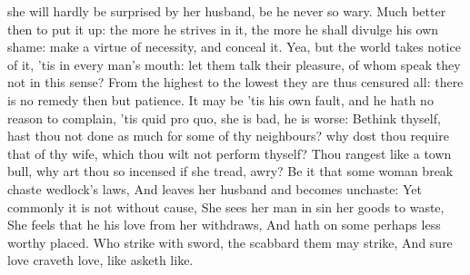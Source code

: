 {she will hardly be surprised by her husband, be he never so wary. Much
better then to put it up: the more he strives in it, the more he shall
divulge his own shame: make a virtue of necessity, and conceal it. Yea,
but the world takes notice of it, 'tis in every man's mouth: let them
talk their pleasure, of whom speak they not in this sense? From the
highest to the lowest they are thus censured all: there is no remedy
then but patience. It may be 'tis his own fault, and he hath no reason
to complain, 'tis quid pro quo, she is bad, he is worse: Bethink
thyself, hast thou not done as much for some of thy neighbours? why
dost thou require that of thy wife, which thou wilt not perform
thyself? Thou rangest like a town bull, why art thou so incensed
if she tread, awry?
Be it that some woman break chaste wedlock's laws,
And leaves her husband and becomes unchaste:
Yet commonly it is not without cause,
She sees her man in sin her goods to waste,
She feels that he his love from her withdraws,
And hath on some perhaps less worthy placed.
Who strike with sword, the scabbard them may strike,
And sure love craveth love, like asketh like.

}
